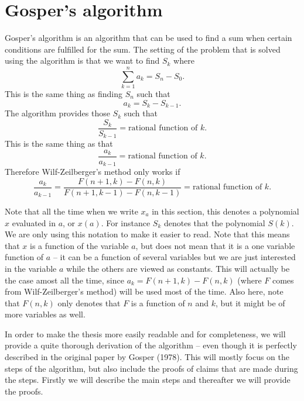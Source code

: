 \section{Gosper's algorithm}\label{Sec: Gosper}
Gosper's algorithm is an algorithm that can be used to find a sum when certain conditions are fulfilled for the sum. The setting of the problem that is solved using the algorithm is that we want to find $S_k$ where
\begin{equation}\label{Eq: Theory,Gosper1}
  \sum_{k=1}^n a_k = S_n-S_0.
\end{equation}
This is the same thing as finding $S_n$ such that
\begin{equation}\label{Eq: Theory,Gosper2}
  a_k = S_k - S_{k-1}.
\end{equation}
The algorithm provides those $S_k$ such that
\begin{equation}
  \frac{S_k}{S_{k-1}} = \text{rational function of } k.
\end{equation}
This is the same thing as that
\begin{equation}
  \frac{a_k}{a_{k-1}} = \text{rational function of } k.
\end{equation}
Therefore Wilf-Zeilberger's method only works if
\begin{equation}
  \frac{a_k}{a_{k-1}} = \frac{F(n+1,k)-F(n,k)}{F(n+1,k-1)-F(n,k-1)} = \text{rational function of } k.
\end{equation}

Note that all the time when we write $x_a$ in this section, this denotes a polynomial $x$ evaluated in $a$, or $x(a)$. For instance $S_k$ denotes that the polynomial $S(k)$. We are only using this notation to make it easier to read. Note that this means that $x$ is a function of the variable $a$, but does not mean that it is a one variable function of $a$ -- it can be a function of several variables but we are just interested in the variable $a$ while the others are viewed as constants. This will actually be the case amost all the time, since $a_k=F(n+1,k)-F(n,k)$ (where $F$ comes from Wilf-Zeilberger's method) will be used most of the time. Also here, note that $F(n,k)$ only denotes that $F$ is a function of $n$ and $k$, but it might be of more variables as well.

In order to make the thesis more easily readable and for completeness, we will provide a quite thorough derivation of the algorithm -- even though it is perfectly described in the original paper by Gosper (1978). This will mostly focus on the steps of the algorithm, but also include the proofs of claims that are made during the steps. Firstly we will describe the main steps and thereafter we will provide the proofs.

